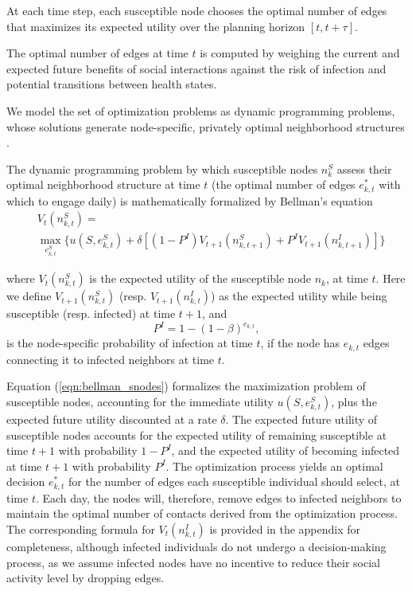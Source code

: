 \documentclass[9pt,twocolumn,twoside]{pnas-new}
\begin{document}
At each time step, each susceptible node chooses the optimal number of edges that maximizes its expected utility over the planning horizon $[t,t+\tau]$.

The optimal number of edges at time $t$ is computed by weighing the current and expected future benefits of social interactions against the risk of infection and potential transitions between health states.

We model the set of optimization problems as dynamic programming problems, whose solutions generate node-specific, privately optimal neighborhood structures \cite{fenichel2011adaptive,perrings2014merging,morin2013sir}.

The dynamic programming problem by which susceptible nodes $n_k^S$ assess their optimal neighborhood structure at time $t$ (the optimal number of edges $e_{k,t}^*$ with which to engage daily) is mathematically formalized by Bellman's equation
\begin{align} \label{eqn:bellman_snodes}
&V_{t}(n_{k,t}^S) = \nonumber \\ &\max_{e_{k,t}^S}\biggl\{u(S,e_{k,t}^S)+\delta[(1-P^I)V_{t+1}(n_{k,t+1}^S)+P^I V_{t+1}(n_{k,t+1}^I) ] \biggr\}
\end{align}

where $V_{t}(n_{k,t}^S)$ is the expected utility of the susceptible node $n_{k}$, at time $t$. Here we define $V_{t+1}(n_{k,t}^S)$ (resp. $V_{t+1}(n_{k,t}^I)$) as the expected utility while being susceptible (resp. infected) at time $t+1$, and
\begin{equation}
    P^I=1-(1-\beta)^{e_{k,t}},
\end{equation}
is the node-specific probability of infection at time $t$, if the node has $e_{k,t}$ edges connecting it to infected neighbors at time $t$.

Equation (\ref{eqn:bellman_snodes}) formalizes the maximization problem of susceptible nodes, accounting for the immediate utility $u(S,e_{k,t}^S)$, plus the expected future utility discounted at a rate $\delta$. The expected future utility of susceptible nodes accounts for the expected utility of remaining susceptible at time $t+1$ with probability $1-P^I$, and the expected utility of becoming infected at time $t+1$ with probability $P^I$. The optimization process yields an optimal decision $e_{k,t}^*$ for the number of edges each susceptible individual should select, at time $t$. Each day, the nodes will, therefore, remove edges to infected neighbors to maintain the optimal number of contacts derived from the optimization process. The corresponding formula for $V_{t}(n_{k,t}^I)$ is provided in the appendix for completeness, although infected individuals do not undergo a decision-making process, as we assume infected nodes have no incentive to reduce their social activity level by dropping edges.
\end{document}
